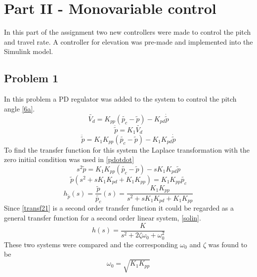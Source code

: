
\section{Part II - Monovariable control} \label{sec:part2}
In this part of the assignment two new controllers were made to control the pitch and travel rate. A controller for elevation was pre-made and implemented into the Simulink model.
\subsection{Problem 1}
In this problem a PD regulator was added to the system to control the pitch angle \eqref{6a}.
    \begin{equation}\label{PDreg}
       {\tilde{V_d}} = K_{pp}(\tilde{p_c} - \tilde{p}) - K_{pd}\dot{\tilde{p}}
    \end{equation}
    \begin{equation*}
        \ddot{\tilde{p}} = K_1\tilde{V_d}
    \end{equation*}
    \begin{equation}\label{pdotdot}
        \ddot{\tilde{p}} = K_1 K_{pp}(\tilde{p_c} - \tilde{p}) - K_1 K_{pd}\dot{\tilde{p}}
    \end{equation}
To find the transfer function for this system the Laplace transformation with the zero initial condition was used in \eqref{pdotdot}
    \begin{equation*}
        s^2\tilde{p} = K_1 K_{pp}(\tilde{p_c} - \tilde{p}) - s K_1 K_{pd}\tilde{p}
    \end{equation*}
    \begin{equation*}
        \tilde{p}(s^2 + s K_1 K_{pd} + K_1 K_{pp}) = K_1 K_{pp} \tilde{p_c}
    \end{equation*}
    \begin{equation}\label{transf21}
        h_{\tilde{p}}(s) = \frac{\tilde{p}}{\tilde{p_c}}(s) = \frac{K_1 K_{pp}}{s^2 + s K_1 K_{pd} + K_1 K_{pp}}
    \end{equation}
Since \eqref{transf21} is a second order transfer function it could be regarded as a general transfer function for a second order linear system, \eqref{solin}.
    \begin{equation}\label{solin}
        h(s) = \frac{K}{s^2 + 2\zeta\omega_0 + \omega_0^2}
    \end{equation}
These two systems were compared and the corresponding $\omega_0$ and $\zeta$ was found to be
    \begin{equation*}
        \omega_0 = \sqrt{K_1 K_{pp}}
    \end{equation*}

